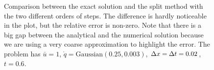 \documentclass[journal,onecolumn]{IEEEtran}
\begin{document}
\begin{figure}[!ht]
	\centering

	\caption{Comparison between the exact solution and the split method with the two different orders of steps. The difference is hardly noticeable in the plot, but the relative error is non-zero. Note that there is a big gap between the analytical  and the numerical solution because we are using a very coarse approximation to highlight the error. The problem has $\bar{u}=1$, $\mathring{q}=\text{Gaussian}(0.25,0.003)$, $\Delta x = \Delta t = 0.02$, $t=0.6$.}
	\label{fi:AB}
\end{figure}
\end{document}
